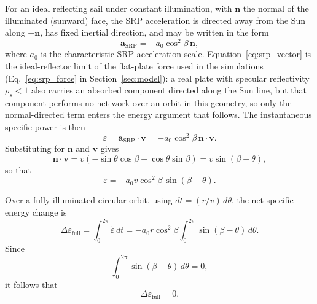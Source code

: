 \vspace{0.5em}
\par\noindent For an ideal reflecting sail under constant illumination, with $\mathbf{n}$ the normal of the illuminated (sunward) face, the SRP acceleration is directed away from the Sun along $-\mathbf{n}$, has fixed inertial direction, and may be written in the form \citep{mcinnes1999}
\begin{equation}
\mathbf{a}_{\text{SRP}} = -a_0 \cos^2\beta \,\mathbf{n},
\label{eq:srp_vector}
\end{equation}
where $a_0$ is the characteristic SRP acceleration scale. Equation~\eqref{eq:srp_vector} is the ideal-reflector limit of the flat-plate force used in the simulations (Eq.~\eqref{eq:srp_force} in Section~\ref{sec:model}): a real plate with specular reflectivity $\rho_s<1$ also carries an absorbed component directed along the Sun line, but that component performs no net work over an orbit in this geometry, so only the normal-directed term enters the energy argument that follows. The instantaneous specific power is then
\begin{equation}
\dot{\varepsilon} = \mathbf{a}_{\text{SRP}}\cdot\mathbf{v}
= -a_0\cos^2\beta\,\mathbf{n}\cdot\mathbf{v}.
\end{equation}
Substituting for $\mathbf{n}$ and $\mathbf{v}$ gives
\begin{equation}
\mathbf{n}\cdot\mathbf{v}
= v(-\sin\theta\cos\beta + \cos\theta\sin\beta)
= v\sin(\beta-\theta),
\end{equation}
so that
\begin{equation}
\dot{\varepsilon} = -a_0 v \cos^2\beta \,\sin(\beta-\theta).
\label{eq:power_phase}
\end{equation}

\vspace{0.5em}
\par\noindent Over a fully illuminated circular orbit, using $dt=(r/v)\,d\theta$, the net specific energy change is
\begin{equation}
\Delta\varepsilon_{\text{full}}
= \int_0^{2\pi}\dot{\varepsilon}\,dt
= -a_0 r \cos^2\beta \int_0^{2\pi}\sin(\beta-\theta)\,d\theta.
\end{equation}
Since
\begin{equation}
\int_0^{2\pi}\sin(\beta-\theta)\,d\theta = 0,
\end{equation}
it follows that
\begin{equation}
\Delta\varepsilon_{\text{full}} = 0.
\label{eq:full_cancellation}
\end{equation}


